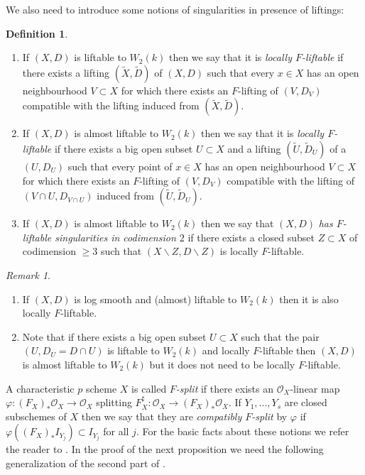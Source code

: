 \documentclass[12pt]{article}
\theoremstyle{plain}
\theoremstyle{definition}
\newtheorem{Definition}[Thm]{Definition}
\theoremstyle{remark}
\newtheorem{Remark}[Thm]{Remark}
\newcommand{\cO}{{\mathcal O}}
\begin{document}
We also need to introduce some notions of singularities in presence of liftings:

\begin{Definition}\label{definition-F-liftable-2}
	\begin{enumerate}
		\item If $(X,D)$ is liftable to $W_2(k)$ then we say that it is  \emph{locally $F$-liftable} if there exists a lifting $(\tilde X, \tilde D)$ of $(X, D)$ such that every $x\in X$ has an open neighbourhood $V\subset X$ for which there exists an $F$-lifting of $(V, D_V)$	compatible with the lifting induced from $(\tilde X, \tilde D)$.
		\item 
		If $(X,D)$ is almost liftable to $W_2(k)$ then we say that it is  \emph{locally $F$-liftable} if there exists a big open subset $U\subset X $ and a  lifting $(\tilde U, \tilde D_U)$ of a  $(U, D_U)$ such that 
		every point of $x\in X$ has an open neighbourhood $V\subset X$ for which there exists an $F$-lifting of $(V, D_V)$ compatible with the lifting of $(V\cap U, D_{V\cap U})$ induced from $(\tilde U, \tilde D_U)$.
		\item If $(X,D)$ is almost liftable to $W_2(k)$ then we say that $(X,D)$ \emph{has $F$-liftable singularities in codimension $2$} if there exists a closed subset $Z\subset X$ of codimension $\ge 3$ such that $(X\backslash Z, D\backslash Z)$ is  locally $F$-liftable.
	\end{enumerate}
\end{Definition}

\begin{Remark}\label{remarks-on-definition-loc-F-lift}
	\begin{enumerate}
		\item If $(X,D)$ is log smooth and (almost) liftable to $W_2(k)$  then it is also locally $F$-liftable.
		\item Note that	if there exists a big open subset $U\subset X$ such that the pair $(U, D_U=D\cap U)$ is liftable to $W_2(k)$ and locally $F$-liftable then $(X,D)$ is almost liftable to $W_2(k)$ but it does not need to be locally $F$-liftable.
	\end{enumerate}
\end{Remark}

\medskip

A characteristic $p$ scheme $X$ is called \emph{$F$-split} if there exists an $\cO_X$-linear map $\varphi :(F_X)_*\cO_X\to \cO_X$ splitting   $F_X^{\sharp}: \cO_X\to (F_X)_*\cO_X$.
If $Y_1,...,Y_s$ are closed subschemes of $X$ then we say that they are \emph{compatibly $F$-split} by $\varphi$ if $\varphi ((F_{X})_* I_{Y_j})\subset I_{Y_j}$ for all $j$.
For the basic facts about these notions we refer the reader to \cite{BK}.
In the proof of the next proposition we need the following generalization of the second part of \cite[Proposition 1.3.11]{BK}.
\end{document}
